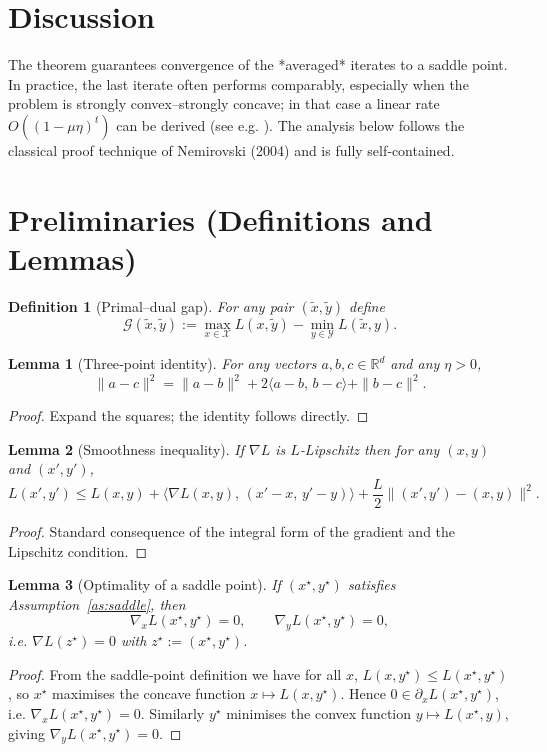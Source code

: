 \documentclass{article}
\newtheorem{lemma}{Lemma}
\newtheorem{definition}{Definition}
\newcommand{\R}{\mathbb{R}}
\begin{document}
\section*{Discussion}
The theorem guarantees convergence of the *averaged* iterates to a saddle point. In practice, the last iterate often performs comparably, especially when the problem is strongly convex–strongly concave; in that case a linear rate $O((1-\mu\eta)^{t})$ can be derived (see e.g. \cite{nemirovski2004prox}). The analysis below follows the classical proof technique of Nemirovski (2004) and is fully self‑contained.

\section*{Preliminaries (Definitions and Lemmas)}
\begin{definition}[Primal–dual gap]
For any pair $(\tilde x,\tilde y)$ define 
\[
\mathcal{G}(\tilde x,\tilde y):=
\max_{x\in\mathcal{X}}L(x,\tilde y)-\min_{y\in\mathcal{Y}}L(\tilde x,y).
\]
\end{definition}
\begin{lemma}[Three‑point identity]\label{lem:three}
For any vectors $a,b,c\in\R^{d}$ and any $\eta>0$,
\[
\|a-c\|^{2}= \|a-b\|^{2}+2\langle a-b,\,b-c\rangle+\|b-c\|^{2}.
\]
\end{lemma}
\begin{proof}
Expand the squares; the identity follows directly. \qedhere
\end{proof}
\begin{lemma}[Smoothness inequality]\label{lem:smooth}
If $\nabla L$ is $L$‑Lipschitz then for any $(x,y)$ and $(x',y')$,
\[
L(x',y')\le L(x,y)+\langle\nabla L(x,y),\,(x'-x,\,y'-y)\rangle
+\frac{L}{2}\|(x',y')-(x,y)\|^{2}.
\]
\end{lemma}
\begin{proof}
Standard consequence of the integral form of the gradient and the Lipschitz condition. \qedhere
\end{proof}
\begin{lemma}[Optimality of a saddle point]\label{lem:opt}
If $(x^{\star},y^{\star})$ satisfies Assumption~\ref{as:saddle}, then  
\[
\nabla_{x}L(x^{\star},y^{\star})=0,\qquad 
\nabla_{y}L(x^{\star},y^{\star})=0,
\]
i.e. $\nabla L(z^{\star})=0$ with $z^{\star}:=(x^{\star},y^{\star})$.
\end{lemma}
\begin{proof}
From the saddle‑point definition we have for all $x$,
$L(x,y^{\star})\le L(x^{\star},y^{\star})$, so $x^{\star}$ maximises the concave function $x\mapsto L(x,y^{\star})$. Hence $0\in\partial_{x}L(x^{\star},y^{\star})$, i.e. $\nabla_{x}L(x^{\star},y^{\star})=0$.  
Similarly $y^{\star}$ minimises the convex function $y\mapsto L(x^{\star},y)$, giving $\nabla_{y}L(x^{\star},y^{\star})=0$. \qedhere
\end{proof}
\end{document}
